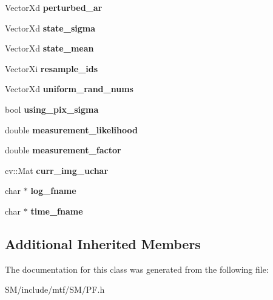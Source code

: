 \begin{DoxyCompactItemize}
\item 
\hypertarget{classPF_a27152b0f4156931edacdcde4a724c44c}{Vector\-Xd {\bfseries perturbed\-\_\-ar}}\label{classPF_a27152b0f4156931edacdcde4a724c44c}

\item 
\hypertarget{classPF_a7eac43b24fbb735041ba743cf79ec651}{Vector\-Xd {\bfseries state\-\_\-sigma}}\label{classPF_a7eac43b24fbb735041ba743cf79ec651}

\item 
\hypertarget{classPF_a2d55271a5e0bcd4a03c8031985b45770}{Vector\-Xd {\bfseries state\-\_\-mean}}\label{classPF_a2d55271a5e0bcd4a03c8031985b45770}

\item 
\hypertarget{classPF_afe970175d733d864dea46e67e805353a}{Vector\-Xi {\bfseries resample\-\_\-ids}}\label{classPF_afe970175d733d864dea46e67e805353a}

\item 
\hypertarget{classPF_a9c0a2bebf9cd9ef539af480c7ee4f86d}{Vector\-Xd {\bfseries uniform\-\_\-rand\-\_\-nums}}\label{classPF_a9c0a2bebf9cd9ef539af480c7ee4f86d}

\item 
\hypertarget{classPF_a9af9d3c0a8c0ffd3165e74fcf1753cad}{bool {\bfseries using\-\_\-pix\-\_\-sigma}}\label{classPF_a9af9d3c0a8c0ffd3165e74fcf1753cad}

\item 
\hypertarget{classPF_ab6d298315972e2f27bc6ee3ec48af13b}{double {\bfseries measurement\-\_\-likelihood}}\label{classPF_ab6d298315972e2f27bc6ee3ec48af13b}

\item 
\hypertarget{classPF_ae5e27e3886882ace407fc2796045495b}{double {\bfseries measurement\-\_\-factor}}\label{classPF_ae5e27e3886882ace407fc2796045495b}

\item 
\hypertarget{classPF_af7d47769a34da7e01e453ecd40f56d40}{cv\-::\-Mat {\bfseries curr\-\_\-img\-\_\-uchar}}\label{classPF_af7d47769a34da7e01e453ecd40f56d40}

\item 
\hypertarget{classPF_a4d393a8c41794b0f74c8d46ad4d67804}{char $\ast$ {\bfseries log\-\_\-fname}}\label{classPF_a4d393a8c41794b0f74c8d46ad4d67804}

\item 
\hypertarget{classPF_a3184f4b71b74dd9b3cf8f87804e49fdb}{char $\ast$ {\bfseries time\-\_\-fname}}\label{classPF_a3184f4b71b74dd9b3cf8f87804e49fdb}

\end{DoxyCompactItemize}
\subsection*{Additional Inherited Members}


The documentation for this class was generated from the following file\-:\begin{DoxyCompactItemize}
\item 
S\-M/include/mtf/\-S\-M/P\-F.\-h\end{DoxyCompactItemize}
